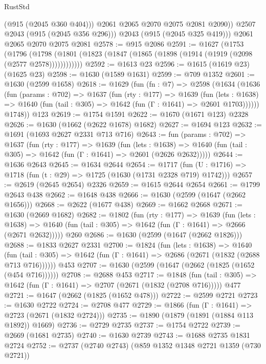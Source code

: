 \begin{lexlean}{RustStd}
\begin{coremodule}
              (@915 (@2045 @360 @404)))
            @2061
            @2065
            @2070
            @2075
            @2081
            @2090))
        @2507
        @2043
        (@915 (@2045 @356 @296)))
      @2043
      (@915 (@2045 @325 @419)))
    @2061
    @2065
    @2070
    @2075
    @2081
@2578 := @915 @2086
@2591 := @1627
    (@1753
      (@1796 (@1798 (@1801 (@1823 (@1847 (@1865 (@1898 (@1914 (@1919 (@2098 (@2577 @2578))))))))))))
@2592 := @1613 @23
@2596 := @1615 (@1619 @23) (@1625 @23)
@2598 := @1630 (@1589 @1631)
@2599 := @709 @1352
@2601 := @1630 (@2599 @1658)
@2618 := @1629
    (fun (fn : @7) =>
    @2598
      (@1634
        (@1636
          (fun (params : @702) =>
          @1637
            (fun (rty : @177) =>
            @1639
              (fun (lets : @1638) =>
              @1640 (fun (tail : @305) => @1642 (fun (Γ : @1641) => @2601 @1703))))))
        @1748))
    @123
@2619 := @1754 @1591
@2622 := @1670 (@1671 @123) @2328
@2626 := @1630 (@1662 (@2622 @1678) @1682)
@2627 := @1694 @123
@2632 := @1691 (@1693 @2627 @2331 @713 @716)
@2643 := fun (params : @702) =>
  @1637
    (fun (rty : @177) =>
    @1639
      (fun (lets : @1638) =>
      @1640 (fun (tail : @305) => @1642 (fun (Γ : @1641) => @2601 (@2626 @2632)))))
@2644 := @1636 @2643
@2645 := @1634 @2644
@2654 := @1717 (fun (U : @1716) => @1718 (fun (t : @29) => @1725 (@1630 (@1731 @2328 @719) @1742)))
@2657 := @2619 (@2645 @2654) @2326
@2659 := @1615 @2644 @2654
@2661 := @1799 @2643 @438
@2662 := @1648 @438
@2666 := @1630 (@2599 (@1647 (@2662 @1656)))
@2668 := @2622 (@1677 @438)
@2669 := @1662 @2668
@2671 := @1630 (@2669 @1682)
@2682 := @1802
    (fun (rty : @177) =>
    @1639
      (fun (lets : @1638) =>
      @1640 (fun (tail : @305) => @1642 (fun (Γ : @1641) => @2666 (@2671 @2632)))))
    @260
@2686 := @1630 (@2599 (@1647 (@2662 @1826)))
@2688 := @1833 @2627 @2331
@2700 := @1824
    (fun (lets : @1638) =>
    @1640 (fun (tail : @305) => @1642 (fun (Γ : @1641) => @2686 (@2671 (@1832 (@2688 @713 @716))))))
    @453
@2707 := @1630 (@2599 (@1647 (@2662 (@1825 (@1652 (@454 @716))))))
@2708 := @2688 @453
@2717 := @1848
    (fun (tail : @305) => @1642 (fun (Γ : @1641) => @2707 (@2671 (@1832 (@2708 @716)))))
    @477
@2721 := @1647 (@2662 (@1825 (@1652 @478)))
@2722 := @2599 @2721
@2723 := @1630 @2722
@2724 := @2708 @477
@2729 := @1866 (fun (Γ : @1641) => @2723 (@2671 (@1832 @2724)))
@2735 := @1890 (@1879 (@1891 (@1884 @113 @1892)) @1669)
@2736 := @2729 @2735
@2737 := @1754 @2722
@2739 := @2669 (@1681 @2735)
@2740 := @1630 @2739
@2743 := @1688 @2735 @1831 @2724
@2752 := @2737 (@2740 @2743) (@859 @1352 @1348 @2721 @1359 (@730 @2721))

\end{coremodule}
\end{lexlean}
